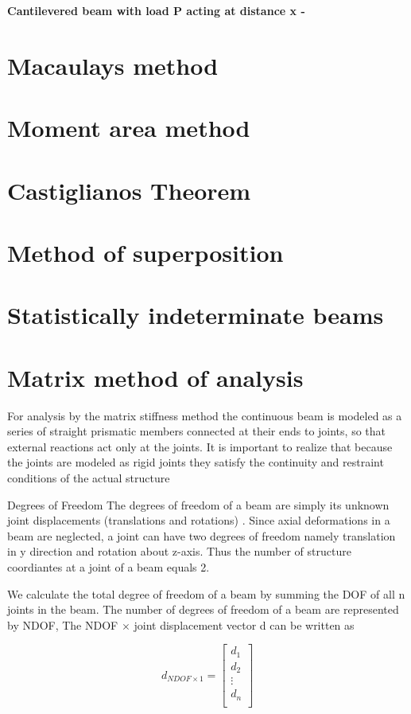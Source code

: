 \documentclass{report}
\begin{document}
\noindent
\textbf{Cantilevered beam with load P acting at distance x -}\\
\section{Macaulays method}

\section{Moment area method}
\section{Castiglianos Theorem}
\section{Method of superposition}
\section{Statistically indeterminate beams}
\section{Matrix method of analysis}
For analysis by the matrix stiffness method the continuous beam is modeled as a series
of straight prismatic members connected  at their ends to joints, so that external reactions
act only at the joints. It is important to realize that because the joints are modeled
as rigid joints they satisfy the continuity and restraint conditions of the actual structure

Degrees of Freedom
The degrees of freedom of a beam are simply its unknown joint displacements (translations and rotations)
. Since axial deformations in a beam are neglected, a joint can have two degrees of freedom
namely translation in y direction and rotation about z-axis. Thus the number of structure
coordiantes at a joint of a beam equals 2.

We calculate the total degree of freedom of a beam by summing the DOF of all n joints
in the beam. The number of degrees of freedom of a beam are represented by NDOF,
The NDOF \(\times\) joint displacement vector d can be written as

\[
  d_{NDOF\times1} =
  \left[ {\begin{array}{c}
    d_1 \\
    d_2 \\
    \vdots \\
    d_n \\
  \end{array} } \right]
\]
\end{document}
